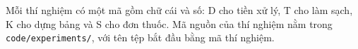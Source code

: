 Mỗi thí nghiệm có một mã gồm chữ cái và số: D cho tiền xử lý, T cho làm sạch, K cho dựng bảng và S cho đơn thuốc.
Mã nguồn của thí nghiệm nằm trong \texttt{code/experiments/}, với tên tệp bắt đầu bằng mã thí nghiệm.
